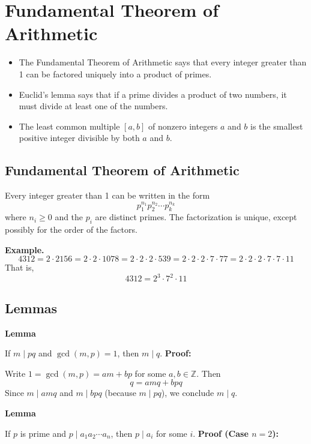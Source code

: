\newpage
\section{Fundamental Theorem of Arithmetic}

\begin{itemize}[label=\(-\)]
	\item The Fundamental Theorem of Arithmetic says that every integer greater than 1 can be factored uniquely into a product of primes.
	\item Euclid’s lemma says that if a prime divides a product of two numbers, it must divide at least one of the numbers.
	\item The least common multiple \([a, b]\) of nonzero integers \(a\) and \(b\) is the smallest positive integer divisible by both \(a\) and \(b\).
\end{itemize}

\subsection{Fundamental Theorem of Arithmetic}

Every integer greater than 1 can be written in the form
\[
	p_1^{n_1}p_2^{n_2} \cdots p_k^{n_k}
\]
where \(n_i \geq 0\) and the \(p_i\) are distinct primes. The factorization is unique, except possibly for the order of the factors.

\textbf{Example.}
\[
	4312 = 2 \cdot 2156 = 2 \cdot 2 \cdot 1078 = 2 \cdot 2 \cdot 2 \cdot 539 = 2 \cdot 2 \cdot 2 \cdot 7 \cdot 77 = 2 \cdot 2 \cdot 2 \cdot 7 \cdot 7 \cdot 11
\]
That is,
\[
	4312 = 2^3 \cdot 7^2 \cdot 11
\]

\subsection{Lemmas}

\textbf{Lemma} 

If \(m \mid pq\) and \(\gcd(m, p) = 1\), then \(m \mid q\).
\newline
\textbf{Proof:} 

Write \(1 = \gcd(m, p) = am + bp\) for some \(a, b \in \mathbb{Z}\).
Then
\[
	q = amq + bpq
\]
Since \(m \mid amq\) and \(m \mid bpq\) (because \(m \mid pq\)), we conclude \(m \mid q\).

\QED


\textbf{Lemma} 

If \(p\) is prime and \(p \mid a_1a_2 \cdots a_n\), then \(p \mid a_i\) for some \(i\).
\newline
\textbf{Proof (Case \(n=2\)):} 

